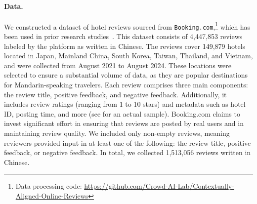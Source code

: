 
\vspace{-.5pc}
\paragraph{Data.}
We constructed a dataset of hotel reviews sourced from \texttt{Booking.com},\footnote{Data processing code: \href{https://github.com/Crowd-AI-Lab/Contextually-Aligned-Online-Reviews}{https://github.com/Crowd-AI-Lab/Contextually-Aligned-Online-Reviews}} which has been used in prior research studies~\cite{ALDERIGHI2022769,barnes-etal-2018-multibooked}.
This dataset consists of 4,447,853 reviews labeled by the platform as written in Chinese.
The reviews cover 149,879 hotels located in Japan, Mainland China, South Korea, Taiwan, Thailand, and Vietnam, and were collected from August 2021 to August 2024. 
These locations were selected to ensure a substantial volume of data, as they are popular destinations for Mandarin-speaking travelers.
Each review comprises three main components: the review title, positive feedback, and negative feedback.
Additionally, it includes review ratings (ranging from 1 to 10 stars) and metadata such as hotel ID, posting time, and more (see  for an actual sample). 
Booking.com claims to invest significant effort in ensuring that reviews are posted by real users and in maintaining review quality. 
We included only non-empty reviews, meaning reviewers provided input in at least one of the following: 
the review title, positive feedback, or negative feedback. 
In total, we collected 1,513,056 reviews written in Chinese.


